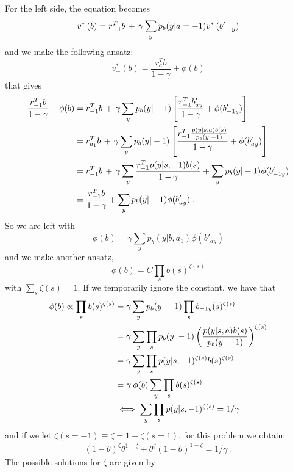 \documentclass[aps,nofootinbib,groupaddress,superscriptaddress,reprint,amsmath,amssymb,graphicx,onecolumn,prx]{revtex4-2}
\begin{document}
For the left side, the equation becomes 
\begin{align}
    v^*_{-}(b)&=r_{-1}^Tb\,+\,\gamma  \sum_yp_b(y|a=-1)v_-^*(b'_{-1y}) \notag \\
\end{align}    
and we make the following ansatz:
\begin{equation}
    v^*_-(b)=\frac{r_a^Tb}{1-\gamma}+\phi(b)
\end{equation}
that gives
\begin{align}
    \frac{r_{-1}^Tb}{1-\gamma}+\phi(b)&=r_{-1}^Tb\,+\,\gamma  \sum_yp_b(y|-1)\left[\frac{r_{-1}^Tb'_{ay}}{1-\gamma}+\phi(b'_{-1y})\right] \notag\\
    &=r_{a_1}^Tb\,+\,\gamma  \sum_yp_b(y|-1)\left[\frac{r_{-1}^T\frac{p(y|s,a) b(s)}{p_b(y|-1)}}{1-\gamma}+\phi(b'_{ay})\right] \notag \\
    &=r_{-1}^Tb\,+\,\gamma\sum_y  \frac{r_{-1}^Tp(y|s,-1) b(s)}{1-\gamma}+\sum_yp_b(y|-1)\phi(b'_{-1y}) \notag\\
    &=\frac{r_{-1}^Tb}{1-\gamma}+\sum_yp_b(y|-1)\phi(b'_{ay}) \; .
\end{align}
So we are left with 
\begin{equation}
    \phi(b)=\gamma\sum_yp_b(y|b,a_1)\phi(b'_{ay})
\end{equation}
and we make another ansatz,
\begin{equation}
    \phi(b)=C\prod_{s} b(s)^{\zeta(s)}
\end{equation}
with $\sum_s\zeta(s)=1$. If we temporarily ignore the constant, we have that
\begin{align}
    \phi(b)\propto\prod_{s} b(s)^{\zeta(s)}&= \gamma\sum_yp_b(y|-1)\prod_{s} b_{-1y}(s)^{\zeta(s)} \notag\\ 
    &=\gamma\sum_y\prod_{s}p_b(y|-1)\left(\frac{p(y|s,a) b(s)}{p_b(y|-1)}\right)^{\zeta(s)} \notag\\
    &=\gamma\sum_y\prod_{s}p(y|s,-1)^{\zeta(s)}b(s)^{\zeta(s)} \notag\\
    &=\gamma\:\phi(b)\sum_y\prod_{s}b(s)^{\zeta(s)} \notag\\
    &\iff \sum_y\prod_{s}p(y|s,-1)^{\zeta(s)}=1/\gamma
\end{align}
and if we let $\zeta(s=-1)\equiv \zeta=1-\zeta(s=1)$, for this problem we obtain:
\begin{align}
    (1-\theta)^\zeta\theta^{1-\zeta}+\theta^\zeta(1-\theta)^{1-\zeta}=1/\gamma \; .
    \label{exponent_eq}
\end{align}
The possible solutions for $\zeta$ are given by 
\end{document}
